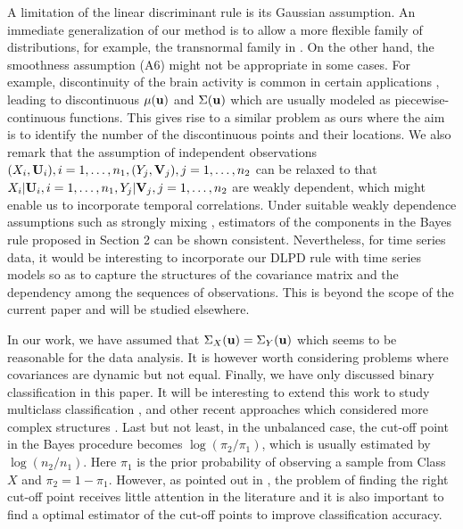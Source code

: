 \documentclass[11pt]{article}
\theoremstyle{definition}
\begin{document}
 A limitation of the linear discriminant rule is its Gaussian assumption. An
 immediate generalization of our method is to allow a more flexible family of
 distributions, for example, the transnormal family in
 \cite{Lin}. On the other hand, the smoothness assumption (A6) might not be appropriate in some cases. For example, discontinuity of the brain activity is common in certain applications \citep{Vairavan2009},  leading to discontinuous $\mu({\bf u})$ and $\Sigma({\bf u})$ which are usually modeled as piecewise-continuous functions. This gives rise to a similar problem as ours where the aim is to identify the number of the discontinuous points and their locations.
 We also remark that the assumption of independent observations $(X_i,{\bf U}_i), i=1,\ldots, n_1, (Y_j,{\bf V}_j), j=1,\ldots, n_2$ can be relaxed to that $X_i| {\bf U}_i,i=1,\ldots,n_1, Y_j| {\bf V}_j, j=1,\ldots, n_2$ are %
 weakly dependent, which might enable us to incorporate temporal correlations. Under suitable weakly dependence assumptions such as strongly mixing \citep{Merl},  %
 estimators of the components in the Bayes rule proposed in Section 2 can be shown consistent. Nevertheless, for time series data, it would be interesting to incorporate our DLPD rule with time series models so as to capture the structures of the covariance matrix and the dependency among the sequences of observations. This is beyond the scope of the current paper and will be studied elsewhere.
 
 
 In our work, we have assumed that $\Sigma_X({\bf u})=\Sigma_Y({\bf u})$ which seems
 to be reasonable for the data analysis. It is however worth considering
 problems where covariances are dynamic but not equal.  Finally, we have only discussed binary
 classification in this paper. It will be interesting to extend this work to study 
 multiclass classification \citep{Pan:etal:2015,Mai:etal:2015},  and other recent approaches which considered more complex structures  \citep{lr}. Last but not least, in the unbalanced case, the cut-off point in the Bayes procedure becomes $\log(\pi_2/\pi_1)$, which is usually estimated by $\log(n_2/n_1)$. Here $\pi_1$ is the prior probability of observing a sample from Class $X$ and $\pi_2=1-\pi_1$. However, as pointed out in \cite{Maiqing2012}, the problem of finding the right cut-off point receives little attention in the literature and it is also important to find a optimal estimator of the cut-off points to improve classification accuracy.
 
\end{document}
